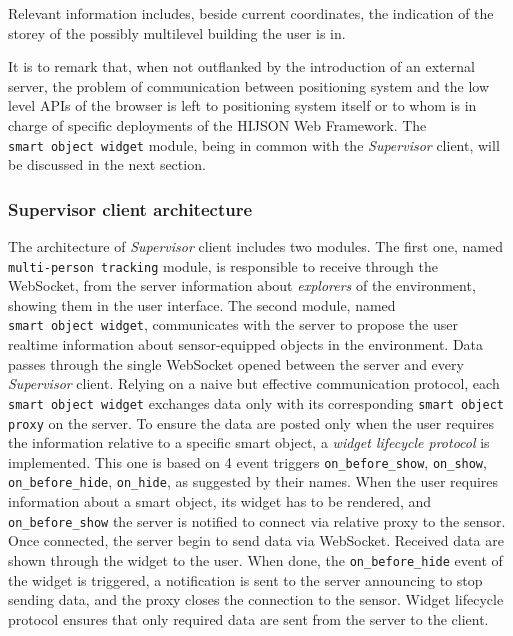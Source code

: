 Relevant information includes, beside current coordinates, the indication of
the storey of the possibly multilevel building the user is in.

It is to remark that, when not outflanked by the introduction of an external
server, the problem of communication between positioning system and the low
level APIs of the browser is left to positioning system itself or to whom is
in charge of specific deployments of the HIJSON Web Framework.
The \texttt{smart\ object\ widget} module, being in common with the
 \emph{Supervisor} client, will be discussed in the next section.

\subsubsection{Supervisor client architecture}\label{supervisor-client-architecture}

The architecture of \emph{Supervisor} client includes two modules. The first
one, named {\tt multi-person\ tracking} module, is responsible to
receive through the WebSocket, from the server information about
\emph{explorers} of the environment, showing them in the user interface. The
second module, named {\tt smart\ object\ widget}, communicates with the
server to propose the user realtime information about sensor-equip\-ped
objects in the environment. Data passes through the single WebSocket
opened between the server and every \emph{Supervisor} client. Relying on a
naive but effective communication protocol, each {\tt smart object widget}
exchanges data only with its corresponding {\tt smart object proxy} on the server. To
ensure the data are posted only when the user requires the information
relative to a specific smart object, a \emph{widget lifecycle protocol} is
implemented. This one is based on 4 event triggers {\tt on\_before\_show},
{\tt on\_show}, {\tt on\_before\_hide}, {\tt on\_hide}, as suggested by their names.
When the user requires information about a smart object, its widget has
to be rendered, and {\tt on\_before\_show} the server is notified to
connect via relative proxy to the sensor. Once connected, the server
begin to send data via WebSocket. Received data are shown through the
widget to the user. When done, the {\tt on\_before\_hide} event of the
widget is triggered, a notification is sent to the server announcing to stop sending
data, and the proxy closes the connection to the sensor. Widget lifecycle
protocol ensures that only required data are sent from the server to the
client.
